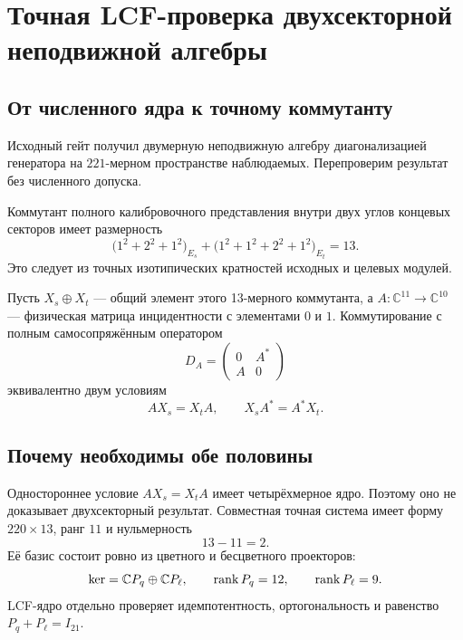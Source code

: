 \chapter{Точная LCF-проверка двухсекторной неподвижной алгебры}
\label{ch:v8-markov-fixed-algebra-lcf-migration-gate}

\section{От численного ядра к точному коммутанту}

Исходный гейт получил двумерную неподвижную алгебру диагонализацией
генератора на $221$-мерном пространстве наблюдаемых. Перепроверим результат
без численного допуска.

Коммутант полного калибровочного представления внутри двух углов концевых секторов имеет
размерность
\begin{equation}
 \bigl(1^2+2^2+1^2\bigr)_{E_s}
 +\bigl(1^2+1^2+2^2+1^2\bigr)_{E_t}=13.
 \label{eq:v8-lcf-gauge-commutant-thirteen}
\end{equation}
Это следует из точных изотипических кратностей исходных  и целевых модулей.

Пусть $X_s\oplus X_t$ --- общий элемент этого 13-мерного коммутанта, а
$A:\mathbb C^{11}\to\mathbb C^{10}$ --- физическая матрица инцидентности с
элементами $0$ и $1$. Коммутирование с полным самосопряжённым оператором
\begin{equation}
 D_A=\begin{pmatrix}0&A^*\\A&0\end{pmatrix}
 \end{equation}
эквивалентно двум условиям
\begin{equation}
 AX_s=X_tA,
 \qquad
 X_sA^*=A^*X_t.
 \label{eq:v8-lcf-two-sided-linking-commutant}
\end{equation}

\section{Почему необходимы обе половины}

Одностороннее условие $AX_s=X_tA$ имеет четырёхмерное ядро. Поэтому оно не
доказывает двухсекторный результат. Совместная точная система имеет форму
$220\times13$, ранг $11$ и нульмерность
\begin{equation}
 13-11=2.
 \label{eq:v8-lcf-fixed-nullity-two}
\end{equation}
Её базис состоит ровно из цветного и бесцветного проекторов:
\begin{equation}
 \ker=\mathbb CP_q\oplus\mathbb CP_\ell,
 \qquad
 \operatorname{rank} P_q=12,
 \qquad
 \operatorname{rank} P_\ell=9.
 \label{eq:v8-lcf-fixed-projector-ranks}
\end{equation}
LCF-ядро отдельно проверяет идемпотентность, ортогональность и равенство
$P_q+P_\ell=I_{21}$.

